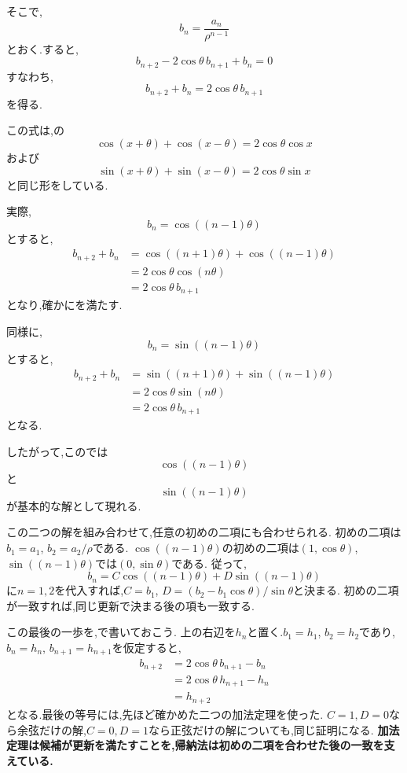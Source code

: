   そこで,
  \[
    b_n=\frac{a_n}{\rho^{n-1}}
  \]
  とおく.すると,
  \[
    b_{n+2}
    -2\cos\theta\,b_{n+1}
    +b_n=0
  \]
  すなわち,
  \[
    b_{n+2}+b_n
    =2\cos\theta\,b_{n+1}
  \]
  を得る.

  この式は,の
  \[
    \cos(x+\theta)+\cos(x-\theta)
    =2\cos\theta\cos x
  \]
  および
  \[
    \sin(x+\theta)+\sin(x-\theta)
    =2\cos\theta\sin x
  \]
  と同じ形をしている.

  実際,
  \[
    b_n=\cos((n-1)\theta)
  \]
  とすると,
  \[
  \begin{aligned}
    b_{n+2}+b_n
    &=
    \cos((n+1)\theta)+\cos((n-1)\theta)
  \\
    &=
    2\cos\theta\cos(n\theta)
  \\
    &=
    2\cos\theta\,b_{n+1}
  \end{aligned}
  \]
  となり,確かにを満たす.

  同様に,
  \[
    b_n=\sin((n-1)\theta)
  \]
  とすると,
  \[
  \begin{aligned}
    b_{n+2}+b_n
    &=
    \sin((n+1)\theta)+\sin((n-1)\theta)
  \\
    &=
    2\cos\theta\sin(n\theta)
  \\
    &=
    2\cos\theta\,b_{n+1}
  \end{aligned}
  \]
  となる.

  したがって,このでは
  \[
    \cos((n-1)\theta)
  \]
  と
  \[
    \sin((n-1)\theta)
  \]
  が基本的な解として現れる.

  この二つの解を組み合わせて,任意の初めの二項にも合わせられる.
  初めの二項は$b_1=a_1$, $b_2=a_2/\rho$である.
  $\cos((n-1)\theta)$の初めの二項は$(1,\cos\theta)$,
  $\sin((n-1)\theta)$では$(0,\sin\theta)$である.
  従って,
  \[
    b_n=C\cos((n-1)\theta)+D\sin((n-1)\theta)
  \]
  に$n=1,2$を代入すれば,$C=b_1$, $D=(b_2-b_1\cos\theta)/\sin\theta$と決まる.
  初めの二項が一致すれば,同じ更新で決まる後の項も一致する.

  この最後の一歩を,で書いておこう.
  上の右辺を$h_n$と置く.$b_1=h_1$, $b_2=h_2$であり,
  $b_n=h_n$, $b_{n+1}=h_{n+1}$を仮定すると,
  \[
    \begin{aligned}
      b_{n+2}&=2\cos\theta\,b_{n+1}-b_n\\
              &=2\cos\theta\,h_{n+1}-h_n\\
              &=h_{n+2}
    \end{aligned}
  \]
  となる.最後の等号には,先ほど確かめた二つの加法定理を使った.
  $C=1,D=0$なら余弦だけの解,$C=0,D=1$なら正弦だけの解についても,同じ証明になる.
  \textbf{加法定理は候補が更新を満たすことを,帰納法は初めの二項を合わせた後の一致を支えている.}

